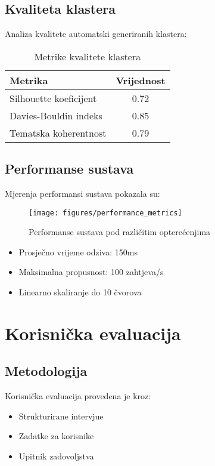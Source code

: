 \subsection{Kvaliteta klastera}
Analiza kvalitete automatski generiranih klastera:

\begin{table}[h]
\centering
\begin{tabular}{|l|c|}
\hline
\textbf{Metrika} & \textbf{Vrijednost} \\
\hline
Silhouette koeficijent & 0.72 \\
Davies-Bouldin indeks & 0.85 \\
Tematska koherentnost & 0.79 \\
\hline
\end{tabular}
\caption{Metrike kvalitete klastera}
\label{tab:cluster_quality}
\end{table}

\subsection{Performanse sustava}
Mjerenja performansi sustava pokazala su:

\begin{figure}[h]
\centering
\texttt{[image: figures/performance\_metrics]}
\caption{Performanse sustava pod različitim opterećenjima}
\label{fig:performance}
\end{figure}

\begin{itemize}
    \item Prosječno vrijeme odziva: 150ms
    \item Maksimalna propusnost: 100 zahtjeva/s
    \item Linearno skaliranje do 10 čvorova
\end{itemize}

\section{Korisnička evaluacija}
\label{sec:user_evaluation}

\subsection{Metodologija}
Korisnička evaluacija provedena je kroz:
\begin{itemize}
    \item Strukturirane intervjue
    \item Zadatke za korisnike
    \item Upitnik zadovoljstva
\end{itemize}

